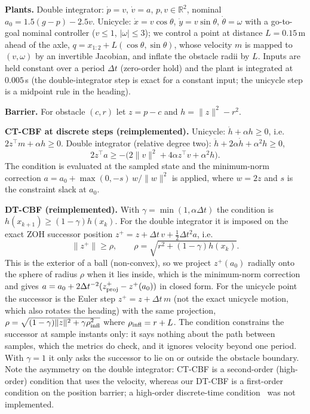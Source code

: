 \textbf{Plants.} Double integrator: $\dot p=v$, $\dot v=a$, $p,v\in\mathbb R^2$, nominal $a_0=1.5(g-p)-2.5v$. Unicycle: $\dot x=v\cos\theta$, $\dot y=v\sin\theta$, $\dot\theta=\omega$ with a go-to-goal nominal controller ($v\le1$, $|\omega|\le3$); we control a point at distance $L=0.15$\,m ahead of the axle, $q=x_{1:2}+L(\cos\theta,\sin\theta)$, whose velocity $m$ is mapped to $(v,\omega)$ by an invertible Jacobian, and inflate the obstacle radii by $L$. Inputs are held constant over a period $\Delta t$ (zero-order hold) and the plant is integrated at $0.005$\,s (the double-integrator step is exact for a constant input; the unicycle step is a midpoint rule in the heading).

\textbf{Barrier.} For obstacle $(c,r)$ let $z=p-c$ and $h=\|z\|^2-r^2$.

\textbf{CT-CBF at discrete steps (reimplemented).} Unicycle: $\dot h+\alpha h\ge0$, i.e. $2z^\top m+\alpha h\ge0$. Double integrator (relative degree two): $\ddot h+2\alpha\dot h+\alpha^2h\ge0$,
\begin{equation}
2z^\top a \ge -\big(2\|v\|^2+4\alpha z^\top v+\alpha^2 h\big).
\end{equation}
The condition is evaluated at the sampled state and the minimum-norm correction $a=a_0+\max(0,-s)\,w/\|w\|^2$ is applied, where $w=2z$ and $s$ is the constraint slack at $a_0$.

\textbf{DT-CBF (reimplemented).} With $\gamma=\min(1,\alpha\Delta t)$ the condition is $h(x_{k+1})\ge(1-\gamma)h(x_k)$. For the double integrator it is imposed on the exact ZOH successor position $z^+=z+\Delta t\,v+\tfrac12\Delta t^2a$, i.e.
\begin{equation}
\|z^+\|\ge\rho,\qquad \rho=\sqrt{r^2+(1-\gamma)h(x_k)} .
\end{equation}
This is the exterior of a ball (non-convex), so we project $z^+(a_0)$ radially onto the sphere of radius $\rho$ when it lies inside, which is the minimum-norm correction and gives $a=a_0+2\Delta t^{-2}(z^+_{\rm proj}-z^+(a_0))$ in closed form. For the unicycle point the successor is the Euler step $z^+=z+\Delta t\,m$ (not the exact unicycle motion, which also rotates the heading) with the same projection, $\rho=\sqrt{(1-\gamma)\|z\|^2+\gamma\rho_{\rm infl}^2}$ where $\rho_{\rm infl}=r+L$. The condition constrains the successor at sample instants only: it says nothing about the path between samples, which the metrics do check, and it ignores velocity beyond one period. With $\gamma=1$ it only asks the successor to lie on or outside the obstacle boundary. Note the asymmetry on the double integrator: CT-CBF is a second-order (high-order) condition that uses the velocity, whereas our DT-CBF is a first-order condition on the position barrier; a high-order discrete-time condition~\cite{xiong2023discrete} was not implemented.

